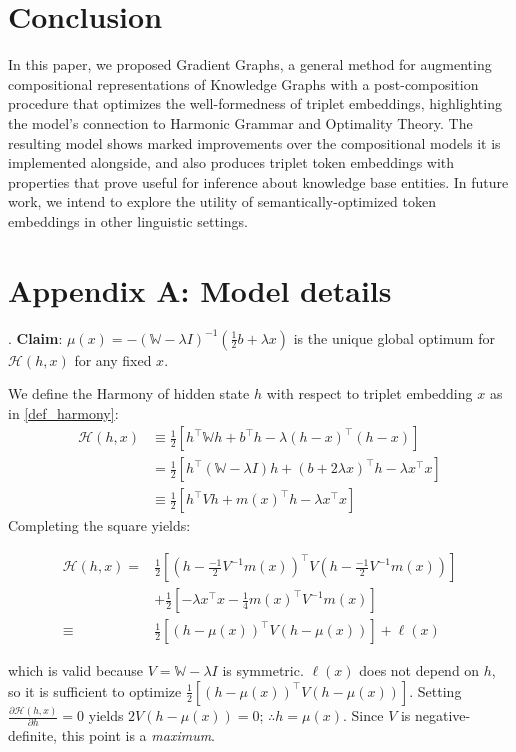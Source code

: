 \documentclass[a4paper,10pt]{article}
\begin{document}
\section{Conclusion} \label{sec_conclusion}

In this paper, we proposed Gradient Graphs, a general method for augmenting compositional representations of Knowledge Graphs with a post-composition procedure that optimizes the well-formedness of triplet embeddings, highlighting the model's connection to Harmonic Grammar and Optimality Theory. The resulting model shows marked improvements over the compositional models it is implemented alongside, and also produces triplet token embeddings with properties that prove useful for inference about knowledge base entities. In future work, we intend to explore the utility of semantically-optimized token embeddings in other linguistic settings.






\section{Appendix A: Model details }

\ex. \textbf{Claim}: $\mu(x) = -(\mathbb{W} - \lambda I)^{-1}(\frac{1}{2}b + \lambda x) $ is the unique global optimum for $\mathcal{H}(h,x)$ for any fixed $x$. \label{claim_mean_optimum}

We define the Harmony of hidden state $h$ with respect to triplet embedding $x$ as in \ref{def_harmony}:
\begin{align*}
\mathcal{H}(h,x) &\equiv \frac{1}{2} \left[  h^\top \mathbb{W} h + b^\top h   - \lambda (h - x)^\top (h-x)  \right] \\
	&= \frac{1}{2}\left[ h^\top \left(\mathbb{W} - \lambda I \right) h + (b + 2\lambda x)^\top h - \lambda x^\top x \right] \\
	&\equiv \frac{1}{2}\left[ h^\top  V h + m(x)^\top h - \lambda x^\top x \right]
\end{align*}
Completing the square yields:
\begin{flushleft}{\scriptsize
\begin{align*}
\mathcal{H}(h,x) =& \frac{1}{2}\left[ \left(h - \frac{-1}{2} V^{-1} m(x)\right)^\top V \left(h - \frac{-1}{2} V^{-1} m(x)\right) \right] \\ & + \frac{1}{2} \left[ - \lambda x^\top x - \frac{1}{4} m(x)^\top V^{-1} m(x) \right] \\
	\equiv & \frac{1}{2}\left[ \left(h - \mu(x) \right)^\top  V \left(h - \mu(x) \right)\right] + \ell(x) 
\end{align*}}\end{flushleft}
which is valid because $V = \mathbb{W}-\lambda I$ is symmetric. $\ell(x)$ does not depend on $h$, so it is sufficient to optimize $\frac{1}{2}\left[ \left(h - \mu(x) \right)^\top  V \left(h - \mu(x) \right)\right]$. Setting $\frac{\partial \mathcal{H}(h,x)}{\partial h} = 0$ yields $2V(h - \mu(x)) = 0$; $\therefore h = \mu(x)$. Since $V$ is negative-definite, this point is a \emph{maximum}. 
\end{document}
